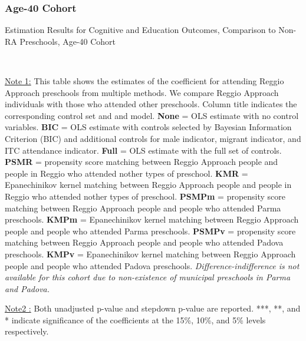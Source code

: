 \subsubsection{Age-40 Cohort}
\begin{table}[H] \caption{Estimation Results for Cognitive and Education Outcomes, Comparison to Non-RA Preschools, Age-40 Cohort} \label{ols-CN-adult40-reg-other}
\scalebox{0.6}{}
\vspace{1ex} \\
\footnotesize\raggedright{\underline{Note 1:} This table shows the estimates of the coefficient for attending Reggio Approach preschools from multiple methods. We compare Reggio Approach individuals with those who attended other preschools. Column title indicates the corresponding control set and and model. \textbf{None} = OLS estimate with no control variables. \textbf{BIC} = OLS estimate with controls selected by Bayesian Information Criterion (BIC) and additional controls for male indicator, migrant indicator, and ITC attendance indicator. \textbf{Full} = OLS estimate with the full set of controls. \textbf{PSMR} =  propensity score matching between Reggio Approach people and people in Reggio who attended nother types of preschool. \textbf{KMR} = Epanechinikov kernel matching between Reggio Approach people and people in Reggio who attended nother types of preschool. \textbf{PSMPm} = propensity score matching between Reggio Approach people and people who attended Parma preschools. \textbf{KMPm} = Epanechinikov kernel matching between Reggio Approach people and people who attended Parma preschools. \textbf{PSMPv} = propensity score matching between Reggio Approach people and people who attended Padova preschools. \textbf{KMPv} = Epanechinikov kernel matching between Reggio Approach people and people who attended Padova preschools. \textit{Difference-indifference is not available for this cohort due to non-existence of municipal preschools in Parma and Padova.}} 

\footnotesize\raggedright{\underline{Note2 :} Both unadjusted p-value and stepdown p-value are reported. ***, **, and * indicate significance of the coefficients at the 15\%, 10\%, and 5\% levels respectively.}
\end{table}

